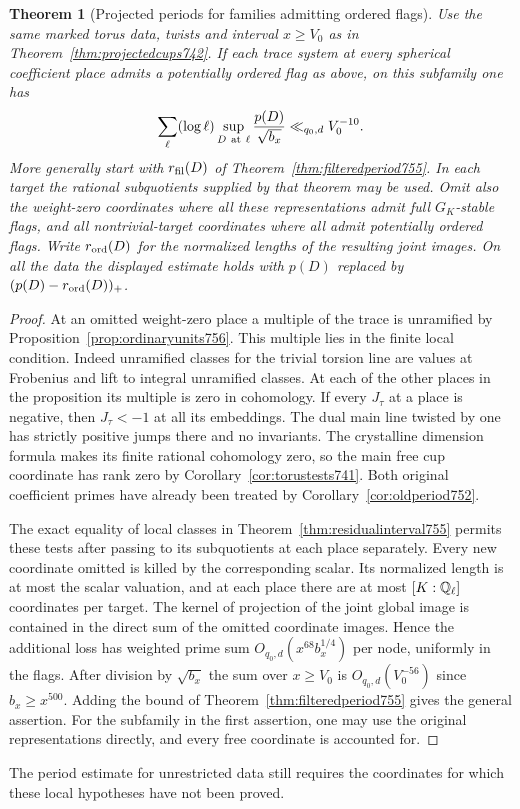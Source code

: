\documentclass[a4paper,11pt]{article}
\newtheorem{theorem}[proposition]{Theorem}
\theoremstyle{definition}
\theoremstyle{remark}
\numberwithin{equation}{section}
\begin{document}
\begin{theorem}[Projected periods for families admitting ordered flags]
\leavevmode\label{thm:ordinaryperiod756}
Use the same marked torus data, twists and interval \(x\ge V_0\)
as in Theorem~\ref{thm:projectedcups742}. If each trace system
at every spherical coefficient place admits a potentially ordered
flag as above, on this subfamily one has
\[
            \sum_\ell(\log\ell)\sup_{D\ {\rm at}\ \ell}
                   \frac{p(D)}{\sqrt{b_x}}\ll_{q_0,d}V_0^{-10}.
\]
More generally start with \(r_{\rm fil}(D)\) of
Theorem~\ref{thm:filteredperiod755}. In each target the rational
subquotients supplied by that theorem may be used. Omit also the
weight-zero coordinates where all these representations admit
full \(G_K\)-stable flags, and all nontrivial-target coordinates
where all admit potentially ordered flags. Write \(r_{\rm ord}(D)\)
for the normalized lengths of the resulting joint images. On all
the data the displayed estimate holds with \(p(D)\) replaced
by \((p(D)-r_{\rm ord}(D))_+\).
\end{theorem}
\begin{proof}
At an omitted weight-zero place a multiple of the trace is
unramified by Proposition~\ref{prop:ordinaryunits756}. This
multiple lies in the finite local condition. Indeed unramified
classes for the trivial torsion line are values at Frobenius
and lift to integral unramified classes. At each of the other
places in the proposition its multiple is zero in cohomology.
If every \(J_\tau\) at a place is negative, then \(J_\tau<-1\)
at all its embeddings. The dual main line twisted by one has
strictly positive jumps there and no invariants. The crystalline
dimension formula makes its finite rational cohomology zero,
so the main free cup coordinate has rank zero by
Corollary~\ref{cor:torustests741}. Both original coefficient
primes have already been treated by Corollary~\ref{cor:oldperiod752}.

The exact equality of local classes in
Theorem~\ref{thm:residualinterval755} permits these tests after
passing to its subquotients at each place separately. Every new
coordinate omitted is killed by the corresponding scalar. Its
normalized length is at most the scalar valuation, and at each
place there are at most \([K:\mathbb Q_\ell]\) coordinates per target.
The kernel of projection of the joint global image is contained
in the direct sum of the omitted coordinate images. Hence the
additional loss has weighted prime sum
\(O_{q_0,d}(x^{68}b_x^{1/4})\) per node, uniformly in the flags.
After division by \(\sqrt{b_x}\) the sum over \(x\ge V_0\) is
\(O_{q_0,d}(V_0^{-56})\) since \(b_x\ge x^{500}\).
Adding the bound of Theorem~\ref{thm:filteredperiod755} gives
the general assertion. For the subfamily in the first assertion,
one may use the original representations directly, and every
free coordinate is accounted for.
\end{proof}
The period estimate for unrestricted data still requires the
coordinates for which these local hypotheses have not been proved.
\clearpage
\end{document}
